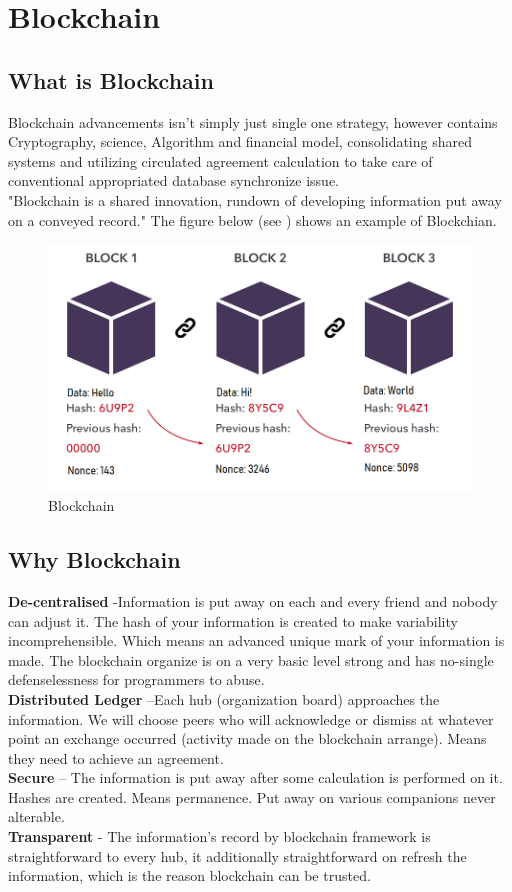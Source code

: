 \chapter{Blockchain\label{sec:Blockchain}}

\section{What is Blockchain}
Blockchain advancements isn't simply just single one strategy, however contains Cryptography, science, Algorithm and financial model, consolidating shared systems and utilizing circulated agreement calculation to take care of conventional appropriated database synchronize issue. \\
"Blockchain is a shared innovation, rundown of developing information put away on a conveyed record."
The figure below (see ) shows an example of Blockchian.
\begin{figure}[h]
	\centering
	\includegraphics[scale=0.40]{figures/03.png}
	\caption{Blockchain }
	\label{fig:istw}
\end{figure}

\section{Why Blockchain}
\textbf{ De-centralised  }-Information is put away on each and every friend and nobody can adjust it. The hash of your information is created to make variability incomprehensible. Which means an advanced unique mark of your information is made. The blockchain organize is on a very basic level strong and has no-single defenselessness for programmers to abuse.\\
\textbf{ Distributed Ledger  } –Each hub (organization board) approaches the information. We will choose peers who will acknowledge or dismiss at whatever point an exchange occurred (activity made on the blockchain arrange). Means they need to achieve an agreement.\\
\textbf{ Secure  } – The information is put away after some calculation is performed on it. Hashes are created. Means permanence. Put away on various companions never alterable. \\ 
\textbf{ Transparent  } - The information's record by blockchain framework is straightforward to every hub, it additionally straightforward on refresh the information, which is the reason blockchain can be trusted.\\ 

